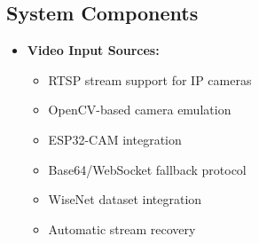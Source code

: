 \documentclass[conference]{IEEEtran}
\begin{document}
\subsection{System Components}
\begin{itemize}
      \item \textbf{Video Input Sources:} 
            \begin{itemize}
                  \item RTSP stream support for IP cameras
                  \item OpenCV-based camera emulation
                  \item ESP32-CAM integration
                  \item Base64/WebSocket fallback protocol
                  \item WiseNet dataset integration
                  \item Automatic stream recovery
            \end{itemize}


\end{itemize}
\end{document}
